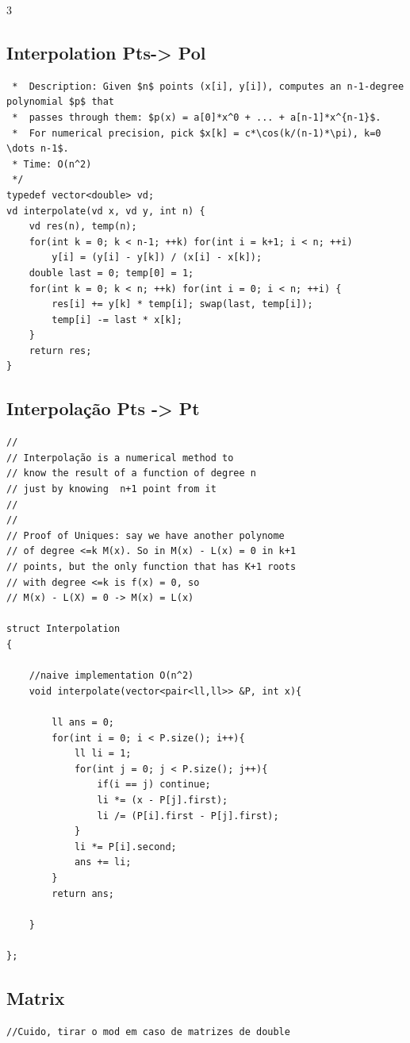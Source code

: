\documentclass[9pt, a4paper, notitlepage]{extreport}
\begin{document}
\begin{multicols}{3}
\subsection{Interpolation Pts-> Pol}
\begin{verbatim}
 *  Description: Given $n$ points (x[i], y[i]), computes an n-1-degree polynomial $p$ that
 *  passes through them: $p(x) = a[0]*x^0 + ... + a[n-1]*x^{n-1}$.
 *  For numerical precision, pick $x[k] = c*\cos(k/(n-1)*\pi), k=0 \dots n-1$.
 * Time: O(n^2)
 */
typedef vector<double> vd;
vd interpolate(vd x, vd y, int n) {
	vd res(n), temp(n);
	for(int k = 0; k < n-1; ++k) for(int i = k+1; i < n; ++i)
		y[i] = (y[i] - y[k]) / (x[i] - x[k]);
	double last = 0; temp[0] = 1;
	for(int k = 0; k < n; ++k) for(int i = 0; i < n; ++i) {
		res[i] += y[k] * temp[i]; swap(last, temp[i]);
		temp[i] -= last * x[k];
	}
	return res;
}
\end{verbatim}

\subsection{Interpolação Pts -> Pt}
\begin{verbatim}
// 
// Interpolação is a numerical method to 
// know the result of a function of degree n 
// just by knowing  n+1 point from it
//
//
// Proof of Uniques: say we have another polynome
// of degree <=k M(x). So in M(x) - L(x) = 0 in k+1
// points, but the only function that has K+1 roots
// with degree <=k is f(x) = 0, so
// M(x) - L(X) = 0 -> M(x) = L(x)

struct Interpolation
{
    
    //naive implementation O(n^2)
    void interpolate(vector<pair<ll,ll>> &P, int x){

        ll ans = 0;
        for(int i = 0; i < P.size(); i++){
            ll li = 1;
            for(int j = 0; j < P.size(); j++){
                if(i == j) continue;
                li *= (x - P[j].first);
                li /= (P[i].first - P[j].first);
            }
            li *= P[i].second;
            ans += li;
        }
        return ans;

    }

};
\end{verbatim}

\subsection{Matrix}
\begin{verbatim}
//Cuido, tirar o mod em caso de matrizes de double


\end{verbatim}
\end{multicols}
\end{document}
